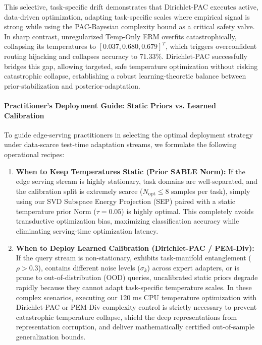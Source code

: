 This selective, task-specific drift demonstrates that Dirichlet-PAC executes active, data-driven optimization, adapting task-specific scales where empirical signal is strong while using the PAC-Bayesian complexity bound as a critical safety valve. In sharp contrast, unregularized Temp-Only ERM overfits catastrophically, collapsing its temperatures to $[0.037, 0.680, 0.679]^T$, which triggers overconfident routing hijacking and collapses accuracy to $71.33\%$. Dirichlet-PAC successfully bridges this gap, allowing targeted, safe temperature optimization without risking catastrophic collapse, establishing a robust learning-theoretic balance between prior-stabilization and posterior-adaptation.

\paragraph{Practitioner's Deployment Guide: Static Priors vs. Learned Calibration}
To guide edge-serving practitioners in selecting the optimal deployment strategy under data-scarce test-time adaptation streams, we formulate the following operational recipes:
\begin{enumerate}
    \item \textbf{When to Keep Temperatures Static (Prior SABLE Norm):} If the edge serving stream is highly stationary, task domains are well-separated, and the calibration split is extremely scarce ($N_{\text{opt}} \le 8$ samples per task), simply using our SVD Subspace Energy Projection (SEP) paired with a static temperature prior Norm ($\tau = 0.05$) is highly optimal. This completely avoids transductive optimization bias, maximizing classification accuracy while eliminating serving-time optimization latency.
    \item \textbf{When to Deploy Learned Calibration (Dirichlet-PAC / PEM-Div):} If the query stream is non-stationary, exhibits task-manifold entanglement ($\rho > 0.3$), contains different noise levels ($\sigma_k$) across expert adapters, or is prone to out-of-distribution (OOD) queries, uncalibrated static priors degrade rapidly because they cannot adapt task-specific temperature scales. In these complex scenarios, executing our 120 ms CPU temperature optimization with Dirichlet-PAC or PEM-Div complexity control is strictly necessary to prevent catastrophic temperature collapse, shield the deep representations from representation corruption, and deliver mathematically certified out-of-sample generalization bounds.
\end{enumerate}

